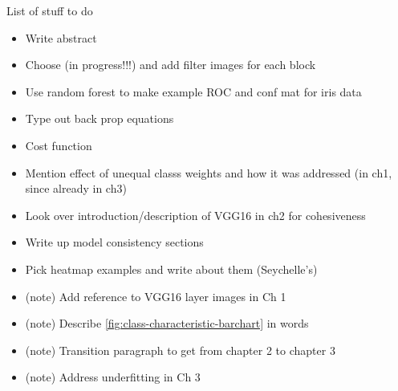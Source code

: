 
List of stuff to do

\begin{itemize}
\item Write abstract
\item Choose (in progress!!!) and add filter images for each block
\item Use random forest to make example ROC and conf mat for iris data
\item Type out back prop equations
\item Cost function
\item Mention effect of unequal classs weights and how it was addressed (in ch1, since already in ch3)
\item Look over introduction/description of VGG16 in ch2 for cohesiveness
\item Write up model consistency sections
\item Pick heatmap examples and write about them (Seychelle's)
\item (\fix note) Add reference to VGG16 layer images in Ch 1
\item (\fix note) Describe \autoref{fig:class-characteristic-barchart} in words
\item (\fix note) Transition paragraph to get from chapter 2 to chapter 3
\item (\fix note) Address underfitting in Ch 3
\end{itemize}
